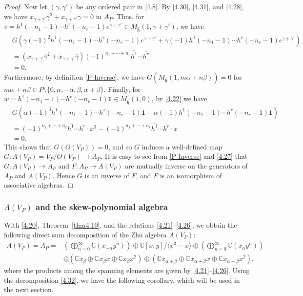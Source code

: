 \documentclass[12pt,a4paper,reqno]{amsart}
\numberwithin{equation}{section}
\numberwithin{equation}{section}
\theoremstyle{definition}
\def \C {\mathbb{C}}
\def \al{\alpha}
\def \ga {\gamma}
\def \b {\beta}
\def \op {\oplus}
\def \vac {\mathbf{1}}
\def \h {\mathfrak{h}}
\def\<{\langle}
\def\>{\rangle}
\begin{document}
\begin{proof}
		Now let $(\ga,\ga')$ be any ordered pair in \eqref{4.8}. By \eqref{4.30}, \eqref{4.31}, and \eqref{4.28}, we have $x_{\ga+\ga'}\overline{\ga}^2+x_{\ga+\ga'}\overline{\ga}=0$ in $A_P$. Thus, for $v=h^1(-n_1-1)\cdots h^r(-n_r-1)e^{\ga+\ga'}\in M_{\hat{\h}}(1,\ga+\ga')$, we have 
		\begin{align*}
			&G(\ga(-1)^2h^1(-n_1-1)\cdots h^r(-n_r-1)e^{\ga+\ga'}+\ga(-1)h^1(-n_1-1)\cdots h^r(-n_r-1)e^{\ga+\ga'})\\
			&=(x_{\ga+\ga'}\overline{\ga}^2+x_{\ga+\ga'}\overline{\ga})(-1)^{n_1+\cdots+n_r} \overline{h^1}\cdots \overline{h^r}\\
			&=0.
		\end{align*}
		Furthermore, by definition \eqref{P-Inverse}, we have $G(M_{\hat{\h}}(1,m\al+n\b))=0$ for $m\al+n\b\in P\setminus\{ 0,\al,-\al, \b,\al+\b\}$. Finally, for $w=h^1(-n_1-1)\cdots h^r(-n_r-1)\vac\in M_{\hat{\h}}(1,0)$, by \eqref{4.22} we have 
		\begin{align*}
			&G(\al(-1)^3 h^1(-n_1-1)\cdots h^r(-n_r-1)\vac-\al(-1)h^1(-n_1-1)\cdots h^r(-n_r-1)\vac)\\
			&=(-1)^{n_1+\cdots+n_r} \overline{h^1}\cdots \overline{h^r} \cdot x^3- (-1)^{n_1+\cdots+n_r} \overline{h^1}\cdots \overline{h^r} \cdot x\\
			&=0.
		\end{align*}
		This shows that $G(O(V_P))=0$, and so $G$ induces a well-defined map $G:A(V_P)=V_P/O(V_P)\to A_P$. It is easy to see from \eqref{P-Inverse} and \eqref{4.27} that $G:A(V_P)\to A_P$ and $F: A_P\to A(V_P)$ are mutually inverse on the generators of $A_P$ and $A(V_P)$. Hence $G$ is an inverse of $F$, and $F$ is an isomorphism of associative algebras.
	\end{proof}
	
	\subsubsection{$A(V_P)$ and the skew-polynomial algebra}
	With \eqref{4.20}, Theorem~\ref{thm4.10}, and the relations \eqref{4.21}--\eqref{4.26}, we obtain the following direct sum decomposition of the Zhu algebra $A(V_P)$: 
	\begin{equation}\label{4.32}
		\begin{aligned}
			A(V_P)=A_P=&\left(\bigoplus_{n=0}^\infty \C(x_{-\al}y^n)\right)\op \C[x,y]/\<x^3-x\>\op \left(\bigoplus_{n=0}^\infty \C (x_{\al}y^n) \right)\\
			&\op \left(\C x_\b\op \C x_\b x\op\C x_\b x^2\right)\op \left(\C x_{\al+\b} \op \C x_{\al+\b}x\op\C x_{\al+\b}x^2\right),
		\end{aligned}
	\end{equation} 
	where the products among the spanning elements are given by \eqref{4.21}--\eqref{4.26}. Using the decomposition \eqref{4.32}, we have the following corollary, which will be used in the next section. 
	
\end{document}
